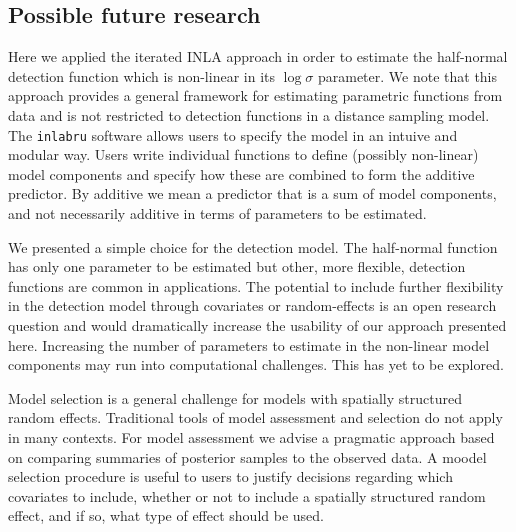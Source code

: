 \documentclass[preprint,12pt]{elsarticle}
\begin{document}
\subsection*{Possible future research}

Here we applied the iterated INLA approach in order to estimate the half-normal detection function which is non-linear in its $\log \sigma$ parameter.  We note that this approach provides a general framework for estimating parametric functions from data and is not restricted to detection functions in a distance sampling model.  The \texttt{inlabru} software allows users to specify the model in an intuive and modular way.  Users write individual functions to define (possibly non-linear) model components and specify how these are combined to form the additive predictor.  By additive we mean a predictor that is a sum of model components, and not necessarily additive in terms of parameters to be estimated.

We presented a simple choice for the detection model.  The half-normal function has only one parameter to be estimated but other, more flexible, detection functions are common in applications.  The potential to include further flexibility in the detection model through covariates or random-effects is an open research question and would dramatically increase the usability of our approach presented here. Increasing the number of parameters to estimate in the non-linear model components may run into computational challenges.  This has yet to be explored.  

Model selection is a general challenge for models with spatially structured random effects.  Traditional tools of model assessment and selection do not apply in many contexts.  For model assessment we advise a pragmatic approach based on comparing summaries of posterior samples to the observed data. A moodel selection procedure is useful to users to justify decisions regarding which covariates to include, whether or not to include a spatially structured random effect, and if so, what type of effect should be used. 



\end{document}
